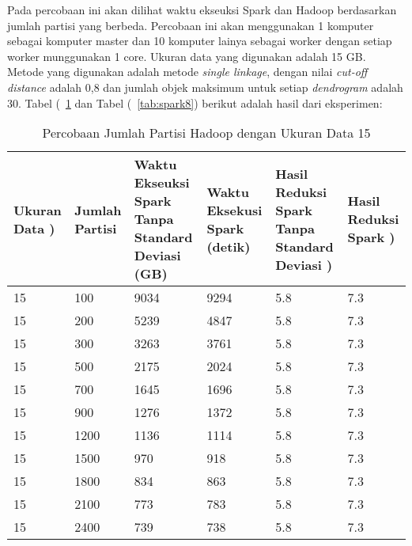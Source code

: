 

Pada percobaan ini akan dilihat waktu ekseuksi Spark dan Hadoop berdasarkan jumlah partisi yang berbeda. Percobaan ini akan menggunakan 1 komputer sebagai komputer master dan 10 komputer lainya sebagai worker dengan setiap worker munggunakan 1 core. Ukuran data yang digunakan adalah 15 GB. Metode yang digunakan adalah metode \textit{single linkage}, dengan nilai \textit{cut-off distance} adalah 0,8 dan jumlah objek maksimum untuk setiap \textit{dendrogram} adalah 30. Tabel (~\ref{tab:spark7} dan Tabel (~\ref{tab:spark8}) berikut adalah hasil dari eksperimen:

\begin{table}[H] 
	\centering 
	\caption{Percobaan Jumlah Partisi Hadoop dengan Ukuran Data 15}
	\label{tab:spark7}
	\begin{tabular}{|p{1cm}|p{1cm}|p{3cm}|p{3cm}|p{3cm}|p{3cm}|}
\hline
Ukuran Data ) & Jumlah Partisi &  Waktu Ekseuksi Spark Tanpa Standard Deviasi (GB) & Waktu Eksekusi Spark (detik) & Hasil Reduksi Spark Tanpa Standard Deviasi ) & Hasil Reduksi Spark )  \\ 
\hline
15 & 100 & 9034  & 9294  &  5.8 & 7.3 \\
\hline
15 & 200 & 5239  & 4847  & 5.8 & 7.3 \\
\hline
15 & 300 & 3263  & 3761  & 5.8 & 7.3 \\
\hline
15 & 500 & 2175  & 2024  &  5.8 & 7.3 \\
\hline
15 & 700 & 1645  & 1696  & 5.8 & 7.3 \\
\hline
15 & 900 & 1276  & 1372  & 5.8 & 7.3 \\
\hline
15 & 1200 & 1136  & 1114  & 5.8 & 7.3 \\
\hline
15 & 1500 & 970  & 918  & 5.8 & 7.3 \\
\hline
15 & 1800 & 834  & 863  & 5.8 & 7.3 \\
\hline
15 & 2100 & 773  & 783  & 5.8 & 7.3 \\
\hline
15 & 2400 & 739  & 738  & 5.8 & 7.3 \\
\hline

\hline

	\end{tabular} 
\end{table}




